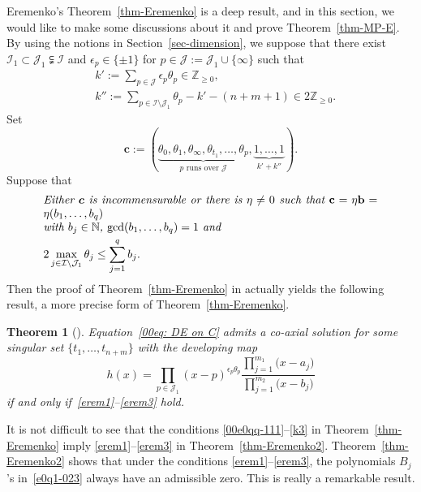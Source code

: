 \documentclass[pdftex]{sigma}
\numberwithin{equation}{section}
\newtheorem{Theorem}{Theorem}[section]
\begin{document}
Eremenko's Theorem~\ref{thm-Eremenko} is a deep result, and in this section, we would like to make some discussions about it and prove Theorem~\ref{thm-MP-E}.
By using the notions in Section~\ref{sec-dimension}, we suppose that there exist $\mathcal{I}_1\subset \mathcal{J}_1\subsetneqq \mathcal{I}$ and $\epsilon_p\in\{\pm 1\}$ for $p\in\mathcal{J}:=\mathcal{J}_1\cup\{\infty\}$ such that
\begin{align}\label{erem1}
&k':=\sum_{p\in\mathcal{J}}\epsilon_p \theta_p\in\mathbb{Z}_{\geq 0},\\
\label{erem2}
&k'':=\sum_{p\in\mathcal{I}\setminus\mathcal{J}_1}\theta_p-k'-(n+m+1)\in 2\mathbb{Z}_{\geq 0}.
\end{align}
Set
\[
 \boldsymbol c:=(\underbrace{\theta_0,\theta_1,\theta_\infty,
 \theta_{t_1},\dots,\theta_{p}}
 _{p\text{ runs over }\mathcal{J}},\underbrace{1,\dots,1}_{k'+k''}).
\]
Suppose that
\begin{equation} \label{erem3}
\begin{aligned}
& \parbox{\dimexpr\linewidth-5em}{\it
 Either $\boldsymbol c$ is incommensurable or there is $\eta\neq0$
 such that $\mathbf{c}=\eta\mathbf{b}=\eta(b_1,\dots,b_q)$\\ with
 $b_j\in\mathbb{N}$, $\gcd (b_1,\dots,b_q)=1$ and}
\\
& 2\max_{j\in\mathcal{I}\setminus\mathcal{J}_1}\theta_j\leq \sum_{j=1}^q b_j.
\end{aligned}
\end{equation}
Then the proof of Theorem~\ref{thm-Eremenko} in \cite{Coaxial} actually yields the following result, a more precise form of Theorem~\ref{thm-Eremenko}.

\begin{Theorem}[{\cite{Coaxial}\label{thm-Eremenko2}}]
Equation~\eqref{00eq: DE on C} admits a co-axial solution for some singular set $\{t_1,\dots,\allowbreak t_{n+m}\}$ with the developing map
\[h(x)=\prod_{p\in\mathcal{J}_1}(x-p)^{\epsilon_p\theta_p}
\frac{\prod_{j=1}^{m_1}\bigl(x-a_j\bigr)}{\prod_{j=1}^{m_2}\bigl(x-b_j\bigr)}\]
if and only if~\eqref{erem1}--\eqref{erem3} hold.
\end{Theorem}


It is not difficult to see that the conditions
\eqref{00e0qq-111}--\eqref{k3} in Theorem~\ref{thm-Eremenko} imply
\eqref{erem1}--\eqref{erem3} in Theorem~\ref{thm-Eremenko2}. Theorem~\ref{thm-Eremenko2} shows that under the conditions
\eqref{erem1}--\eqref{erem3}, the polynomials $B_j$'s in~\eqref{e0q1-023} always have an admissible zero. This is really a
remarkable result.
\end{document}
